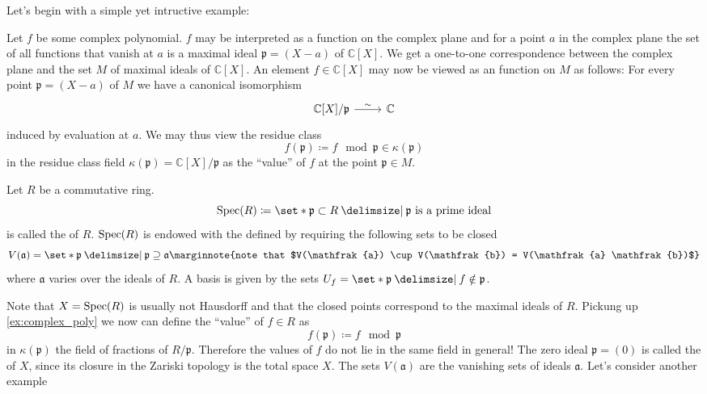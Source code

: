 Let's begin with a simple yet intructive example:
\begin{example}
	\label{ex:complex_poly}
	Let $f$ be some complex polynomial.
	$f$ may be interpreted as a function on the complex plane and for a point $a$ in the complex plane the set of all functions that vanish at $a$ is a maximal ideal $\mathfrak{p}=(X-a)$ of $\mathbb{C}[X]$.
	We get a one-to-one correspondence between the complex plane and the set $M$ of maximal ideals of $\mathbb{C}[X]$.
	An element $f \in \mathbb{C}[X]$ may now be viewed as an function on $M$ as follows:
	For every point $\mathfrak{p}=(X-a)$ of $M$ we have a canonical isomorphism
	\[
		\begin{tikzcd}
			\mathbb{C}[X]/\mathfrak{p} \rar["\sim"] & \mathbb{C}
		\end{tikzcd}
	\]
	induced by evaluation at $a$.
	We may thus view the residue class
	\[
		f(\mathfrak{p}) \coloneqq f \mod \mathfrak{p} \in \kappa(\mathfrak{p})
	\]
	in the residue class field $\kappa(\mathfrak{p}) = \mathbb{C}[X]/\mathfrak{p}$ as the \enquote{value} of $f$ at the point $\mathfrak{p} \in M$.
\end{example}

\begin{definition}[{name=[prime spectrum]}]
	Let $R$ be a commutative ring.
	\[
		\Spec(R) \coloneqq \set*{\mathfrak{p} \subset R \given \mathfrak{p} \text{ is a prime ideal} }
	\]
	is called the  of $R$.
	$\operatorname{Spec}(R)$ is endowed with the  defined by requiring the following sets to be closed
	\[
		V(\mathfrak{a}) = \set*{\mathfrak{p} \given \mathfrak{p} \supseteq \mathfrak{a}}\marginnote{note that $V(\mathfrak{a}) \cup V(\mathfrak{b}) = V(\mathfrak{a} \mathfrak{b})$}
	\]
	where $\mathfrak{a}$ varies over the ideals of $R$.
	A basis is given by the sets $U_f = \set*{\mathfrak{p} \given f \notin \mathfrak{p}}$.
\end{definition}

Note that $X= \operatorname{Spec}(R)$ is usually not Hausdorff and that the closed points correspond to the maximal ideals of $R$.
Pickung up \cref{ex:complex_poly} we now can define the \enquote{value} of $f \in R$  as
\[
	f(\mathfrak{p}) \coloneqq f \mod \mathfrak{p}
\]
in $\kappa(\mathfrak{p})$ the field of fractions of $R/\mathfrak{p}$.
Therefore the values of $f$ do not lie in the same field in general!
The zero ideal $\mathfrak{p}= (0)$ is called the  of $X$, since its closure in the Zariski topology is the total space $X$.
The sets $V(\mathfrak{a})$ are the vanishing sets of ideals $\mathfrak{a}$.
Let's consider another example


